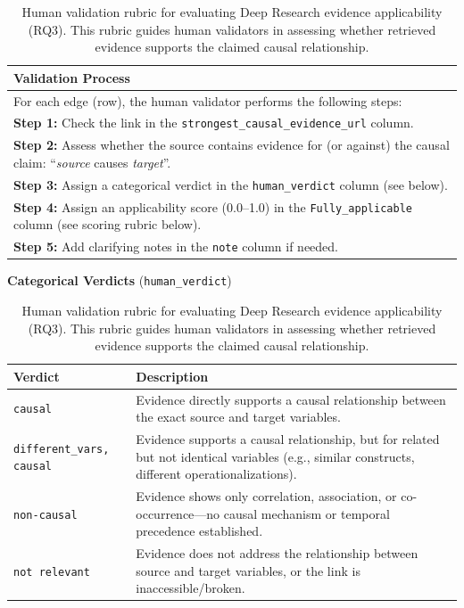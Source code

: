 \begin{table}[H]
\centering
\caption[Human validation rubric for RQ3]{Human validation rubric for evaluating Deep Research evidence applicability (RQ3). This rubric guides human validators in assessing whether retrieved evidence supports the claimed causal relationship.}
\label{tab:human-validation-rubric-rq3}
\small

\begin{tabular}{p{}}
\toprule
\textbf{Validation Process} \\
\midrule
For each edge (row), the human validator performs the following steps: \\[0.5em]

\textbf{Step 1:} Check the link in the \texttt{strongest\_causal\_evidence\_url} column. \\[0.3em]

\textbf{Step 2:} Assess whether the source contains evidence for (or against) the causal claim: ``\textit{source} causes \textit{target}''. \\[0.3em]

\textbf{Step 3:} Assign a categorical verdict in the \texttt{human\_verdict} column (see below). \\[0.3em]

\textbf{Step 4:} Assign an applicability score (0.0--1.0) in the \texttt{Fully\_applicable} column (see scoring rubric below). \\[0.3em]

\textbf{Step 5:} Add clarifying notes in the \texttt{note} column if needed. \\
\bottomrule
\end{tabular}

\vspace{1em}

\textbf{Categorical Verdicts} (\texttt{human\_verdict})

\vspace{0.5em}

\begin{tabular}{|p{3.8cm}|p{9.5cm}|}
\hline
\textbf{Verdict} & \textbf{Description} \\
\hline
\texttt{causal} & Evidence directly supports a causal relationship between the exact source and target variables. \\
\hline
\texttt{different\_vars, causal} & Evidence supports a causal relationship, but for related but not identical variables (e.g., similar constructs, different operationalizations). \\
\hline
\texttt{non-causal} & Evidence shows only correlation, association, or co-occurrence---no causal mechanism or temporal precedence established. \\
\hline
\texttt{not relevant} & Evidence does not address the relationship between source and target variables, or the link is inaccessible/broken. \\
\hline
\end{tabular}


\end{table}
